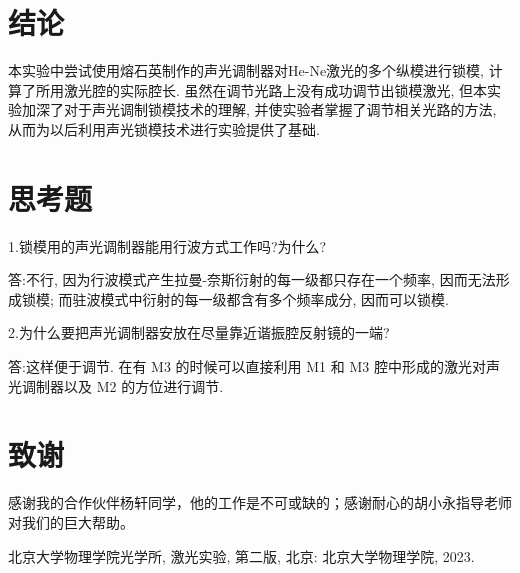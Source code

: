 \documentclass[aps,pre,12pt,preprint,%
	onecolumn,showpacs,showkeys,nofootinbib]{revtex4-2}
\begin{document}
\section{结论}
本实验中尝试使用熔石英制作的声光调制器对He-Ne激光的多个纵模进行锁模, 计算了所用激光腔的实际腔长. 虽然在调节光路上没有成功调节出锁模激光, 但本实验加深了对于声光调制锁模技术的理解, 并使实验者掌握了调节相关光路的方法, 从而为以后利用声光锁模技术进行实验提供了基础.
\section{思考题}
1.锁模用的声光调制器能用行波方式工作吗?为什么?
\par 答:不行, 因为行波模式产生拉曼-奈斯衍射的每一级都只存在一个频率, 因而无法形成锁模; 而驻波模式中衍射的每一级都含有多个频率成分, 因而可以锁模.

2.为什么要把声光调制器安放在尽量靠近谐振腔反射镜的一端?
\par 答:这样便于调节. 在有 M3 的时候可以直接利用 M1 和 M3 腔中形成的激光对声光调制器以及 M2 的方位进行调节.
\section{致谢}
	感谢我的合作伙伴杨轩同学，他的工作是不可或缺的；感谢耐心的胡小永指导老师对我们的巨大帮助。
\begin{thebibliography}{99}
	北京大学物理学院光学所, 激光实验, 第二版, 北京: 北京大学物理学院, 2023.
\end{thebibliography}
\clearpage
\end{document}
